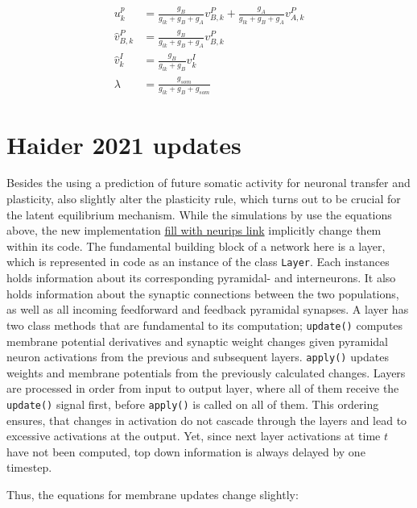\begin{align}
  u_k^p           & = \frac{g_B}{g_{lk} + g_B + g_A} v^P_{B,k} + \frac{g_A}{g_{lk} + g_B + g_A} v^P_{A,k} \\
  \hat{v}^P_{B,k} & = \frac{g_B}{g_{lk} + g_B + g_A} v^P_{B,k}                                            \\
  \hat{v}^I_{k}   & = \frac{g_B}{g_{lk} + g_B} v^I_{k}                                                    \\
  \lambda         & = \frac{g_{som}}{g_{lk} + g_B + g_{som}}
\end{align}



\section{Haider 2021 updates}\label{sec-haider}

Besides the using a prediction of future somatic activity for neuronal transfer and plasticity, \cite{Haider2021} also
slightly alter the plasticity rule, which turns out to be crucial for the latent equilibrium mechanism. While the
simulations by \cite{sacramento2018dendritic} use the equations above, the new implementation
\href{https://github.com/neurips}{fill with neurips link} implicitly change them within its code. The fundamental
building block of a network here is a layer, which is represented in code as an instance of the class \texttt{Layer}.
Each instances holds information about its corresponding pyramidal- and interneurons. It also holds information about
the synaptic connections between the two populations, as well as all incoming feedforward and feedback pyramidal
synapses. A layer has two class methods that are fundamental to its computation; \texttt{update()} computes membrane
potential derivatives and synaptic weight changes given pyramidal neuron activations from the previous and subsequent
layers. \texttt{apply()} updates weights and membrane potentials from the previously calculated changes. Layers are
processed in order from input to output layer, where all of them receive the \texttt{update()} signal first, before
\texttt{apply()} is called on all of them. This ordering ensures, that changes in activation do not cascade through the
layers and lead to excessive activations at the output. Yet, since next layer activations at time $t$ have not been
computed, top down information is always delayed by one timestep.


Thus, the equations for membrane updates change slightly:

